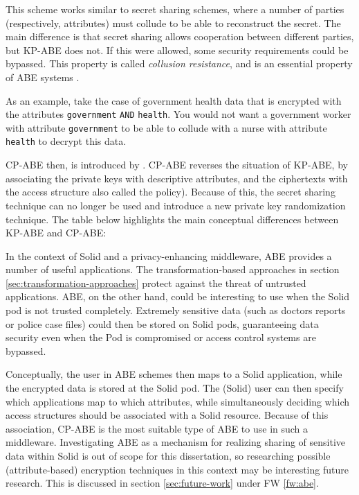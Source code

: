 

\noindent This scheme works similar to secret sharing schemes, where a number of parties (respectively, attributes) must collude to be able to reconstruct the secret. The main difference is that secret sharing allows cooperation between different parties, but \gls{KP-ABE} does not. If this were allowed, some security requirements could be bypassed. This property is called \textit{collusion resistance}, and is an essential property of \gls{ABE} systems \citep{cp-abe}. 

As an example, take the case of government health data that is encrypted with the attributes \texttt{government} \texttt{AND} \texttt{health}. You would not want a government worker with attribute \texttt{government} to be able to collude with a nurse with attribute \texttt{health} to decrypt this data.

\noindent \acrlong{CP-ABE} then, is introduced by \citet{cp-abe}. \Gls{CP-ABE} reverses the situation of \gls{KP-ABE}, by associating the private keys with descriptive attributes, and the ciphertexts with the access structure also called the policy). Because of this, the secret sharing technique can no longer be used and \citeauthor{cp-abe} introduce a new private key randomization technique. The table below highlights the main conceptual differences between \gls{KP-ABE} and \gls{CP-ABE}:


\noindent In the context of Solid and a privacy-enhancing middleware, \gls{ABE} provides a number of useful applications. The transformation-based approaches in section \ref{sec:transformation-approaches} protect against the threat of untrusted applications. \Gls{ABE}, on the other hand, could be interesting to use when the Solid pod is not trusted completely. Extremely sensitive data (such as doctors reports or police case files) could then be stored on Solid pods, guaranteeing data security even when the Pod is compromised or access control systems are bypassed.

Conceptually, the user in \gls{ABE} schemes then maps to a Solid application, while the encrypted data is stored at the Solid pod. The (Solid) user can then specify which applications map to which attributes, while simultaneously deciding which access structures should be associated with a Solid resource. Because of this association, \gls{CP-ABE} is the most suitable type of \gls{ABE} to use in such a middleware. Investigating \gls{ABE} as a mechanism for realizing sharing of sensitive data within Solid is out of scope for this dissertation, so researching possible (attribute-based) encryption techniques in this context may be interesting future research. This is discussed in section \ref{sec:future-work} under FW \ref{fw:abe}.

